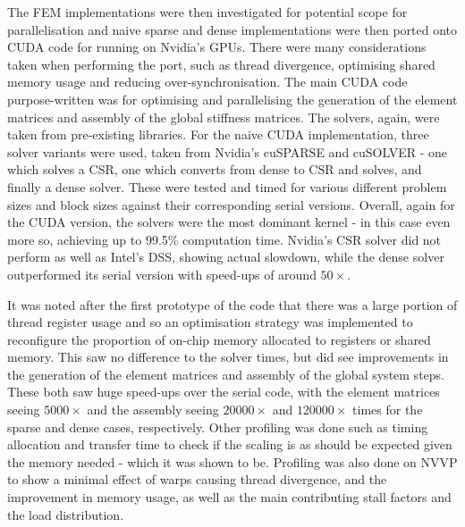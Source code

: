 The FEM implementations were then investigated for potential scope for parallelisation and naive sparse and dense implementations were then ported onto CUDA code for running on Nvidia's GPUs. There were many considerations taken when performing the port, such as thread divergence, optimising shared memory usage and reducing over-synchronisation. The main CUDA code purpose-written was for optimising and parallelising the generation of the element matrices and assembly of the global stiffness matrices. The solvers, again, were taken from pre-existing libraries. For the naive CUDA implementation, three solver variants were used, taken from Nvidia's cuSPARSE and cuSOLVER - one which solves a CSR, one which converts from dense to CSR and solves, and finally a dense solver. These were tested and timed for various different problem sizes and block sizes against their corresponding serial versions. Overall, again for the CUDA version, the solvers were the most dominant kernel - in this case even more so, achieving up to 99.5\% computation time. Nvidia's CSR solver did not perform as well as Intel's DSS, showing actual slowdown, while the dense solver outperformed its serial version with speed-ups of around $50\times$. 

It was noted after the first prototype of the code that there was a large portion of thread register usage and so an optimisation strategy was implemented to reconfigure the proportion of on-chip memory allocated to registers or shared memory. This saw no difference to the solver times, but did see improvements in the generation of the element matrices and assembly of the global system steps. These both saw huge speed-ups over the serial code, with the element matrices seeing $5000\times$ and the assembly seeing $20000\times$ and $120000\times$ times for the sparse and dense cases, respectively. Other profiling was done such as timing allocation and transfer time to check if the scaling is as should be expected given the memory needed - which it was shown to be. Profiling was also done on NVVP to show a minimal effect of warps causing thread divergence, and the improvement in memory usage, as well as the main contributing stall factors and the load distribution.

